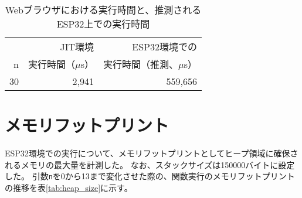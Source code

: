 \begin{table}[htbp]
  \caption{Webブラウザにおける実行時間と、推測されるESP32上での実行時間}
  \label{tab:fib_time_browser}
  \begin{center}
    \begin{tabular}{rrr}
      \hline
         & JIT環境 & ESP32環境での \\
       n & 実行時間（$\mu$s） & 実行時間（推測、$\mu$s） \\ \hline \hline
      30 & 2,941 & 559,656 \\ \hline
    \end{tabular}
  \end{center}
\end{table}

\section{メモリフットプリント}

ESP32環境での実行について、メモリフットプリントとしてヒープ領域に確保されるメモリの最大量を計測した。
なお、スタックサイズは150000バイトに設定した。
引数\verb|n|を0から13まで変化させた際の、関数実行のメモリフットプリントの推移を表\ref{tab:heap_size}に示す。

